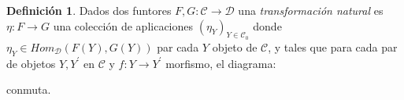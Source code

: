 \documentclass{article}
\theoremstyle{plain}
\theoremstyle{definition}
\newtheorem{definition}[theorem]{Definición}
\theoremstyle{remark}
\begin{document}
\begin{definition}
    Dados dos funtores $F,G:\mathcal{C} \to \mathcal{D}$ una \textit{transformación natural} es $\eta:F \to G$ una colección de aplicaciones $(\eta_Y)_{Y \in \mathcal{C}_0}$ donde $\eta_Y \in Hom_{\mathcal{D}}(F(Y),G(Y))$ par cada $Y$ objeto de $\mathcal{C}$, y tales que para cada par de objetos $Y,Y^\prime$ en $\mathcal{C}$ y $f:Y \to Y^\prime$ morfismo, el diagrama:

    \begin{center}
\end{center}

conmuta.
\end{definition}
\end{document}
